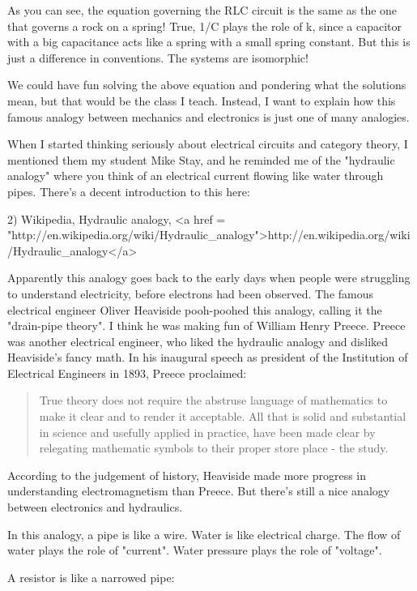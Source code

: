As you can see, the equation governing the RLC circuit is the same as
the one that governs a rock on a spring!  True, 1/C plays the role of
k, since a capacitor with a big capacitance acts like a spring with a
small spring constant.  But this is just a difference in conventions.
The systems are isomorphic!

We could have fun solving the above equation and pondering what the 
solutions mean, but that would be the class I teach.  Instead,
I want to explain how this famous analogy between mechanics and 
electronics is just one of many analogies.

When I started thinking seriously about electrical circuits and
category theory, I mentioned them my student Mike Stay, and he
reminded me of the "hydraulic analogy" where you think of an
electrical current flowing like water through pipes.  There's a 
decent introduction to this here:

2) Wikipedia, Hydraulic analogy, 
<a href = "http://en.wikipedia.org/wiki/Hydraulic_analogy">http://en.wikipedia.org/wiki/Hydraulic_analogy</a>
 
Apparently this analogy goes back to the early days when people were
struggling to understand electricity, before electrons had been
observed.  The famous electrical engineer Oliver Heaviside pooh-poohed
this analogy, calling it the "drain-pipe theory".  I think
he was making fun of William Henry Preece.  Preece was another
electrical engineer, who liked the hydraulic analogy and disliked
Heaviside's fancy math.  In his inaugural speech as president of the
Institution of Electrical Engineers in 1893, Preece proclaimed:

\begin{quote}
  True theory does not require the abstruse language of mathematics to 
  make it clear and to render it acceptable.   All that is solid and 
  substantial in science and usefully applied in practice, have been 
  made clear by relegating mathematic symbols to their proper store 
  place - the study.
\end{quote}
    

According to the judgement of history, Heaviside made more progress in
understanding electromagnetism than Preece.  But there's still a nice
analogy between electronics and hydraulics.

In this analogy, a pipe is like a wire.  Water is like electrical
charge.  The flow of water plays the role of "current".
Water pressure plays the role of "voltage".

A resistor is like a narrowed pipe:

